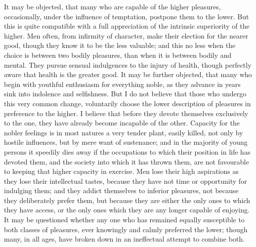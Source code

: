 \documentclass[12pt]{report}
\begin{document}
It may be objected, that many who are capable of the higher pleasures, occasionally, under the influence of temptation, postpone them to the lower. But this is quite compatible with a full appreciation of the intrinsic superiority of the higher. Men often, from infirmity of character, make their election for the nearer good, though they know it to be the less valuable; and this no less when the choice is between two bodily pleasures, than when it is between bodily and mental. They pursue sensual indulgences to the injury of health, though perfectly aware that health is the greater good. It may be further objected, that many who begin with youthful enthusiasm for everything noble, as they advance in years sink into indolence and selfishness. But I do not believe that those who undergo this very common change, voluntarily choose the lower description of pleasures in preference to the higher. I believe that before they devote themselves exclusively to the one, they have already become incapable of the other. Capacity for the nobler feelings is in most natures a very tender plant, easily killed, not only by hostile influences, but by mere want of sustenance; and in the majority of young persons it speedily dies away if the occupations to which their position in life has devoted them, and the society into which it has thrown them, are not favourable to keeping that higher capacity in exercise. Men lose their high aspirations as they lose their intellectual tastes, because they have not time or opportunity for indulging them; and they addict themselves to inferior pleasures, not because they deliberately prefer them, but because they are either the only ones to which they have access, or the only ones which they are any longer capable of enjoying. It may be questioned whether any one who has remained equally susceptible to both classes of pleasures, ever knowingly and calmly preferred the lower; though many, in all ages, have broken down in an ineffectual attempt to combine both.
\end{document}
